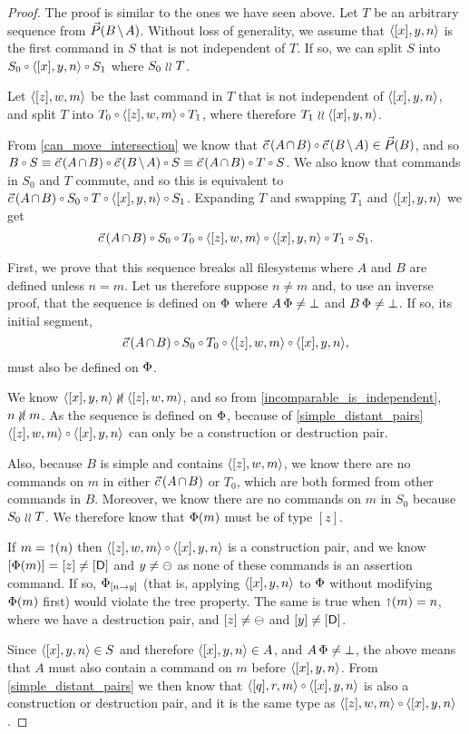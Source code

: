 \begin{proof}
The proof is similar to the ones we have seen above.
Let $T$ be an arbitrary sequence from $\orderset{\bmanp}$.
Without loss of generality, we assume that $\langle{[x],y,n}\rangle$ is the first command in $S$
that is not independent of $T$.
If so, we can split $S$ into $S_0\cc\cxynv\cc S_1$ where $S_0\mathrel{\wr\wr} T$.

Let $\langle{[z],w,m}\rangle$ be the last command in $T$ that is not independent of $\langle{[x],y,n}\rangle$,
and split $T$ into $T_0\cc\czwmv\cc T_1$, where therefore $T_1\mathrel{\wr\wr}\langle{[x],y,n}\rangle$.

From \cref{can_move_intersection} we know that
$\acb\cc\bma \in \orderset{B}$, and so
$B\cc S \equiv \acb\cc\bma\cc S \equiv \acb\cc T\cc S$.
We also know that commands in $S_0$ and $T$ commute, and so this is equivalent to
$\acb\cc S_0\cc T\cc\cxynv\cc S_1$.
Expanding $T$ and swapping $T_1$ and $\langle{[x],y,n}\rangle$ we get
\[ \acb\cc S_0\cc T_0 \cc \czwmv \cc \cxynv\cc T_1\cc S_1. \]

First, we prove that this sequence breaks all filesystems
where $A$ and $B$ are defined unless $n=m$.
Let us therefore suppose $n\neq m$ and, to use an inverse proof,
that the sequence is defined on $\Phi$ 
where $A\,\Phi\neq\bot$ and $B\,\Phi\neq\bot$.
If so, its initial segment,
\[ \acb\cc S_0\cc T_0 \cc \czwmv \cc \cxynv, \]
must also be defined on $\Phi$.

We know $\cxynv\nindep\czwmv$, and so from \cref{incomparable_is_independent}, $n\nunrel m$.
As the sequence is defined on $\Phi$,
because of \cref{simple_distant_pairs}
$\czwmv\cc\cxynv$ can only be a construction or destruction pair.

Also, because $B$ is simple and contains $\langle{[z],w,m}\rangle$,
we know there are no commands on $m$ 
in either $\acb$ or $T_0$, which are both formed from other commands in $B$.
Moreover, we know there are no commands on $m$ in $S_0$ because $S_0\mathrel{\wr\wr} T$.
We therefore know that $\Phi(m)$ must be of type $[z]$.

If $m=\mathord{\shortuparrow}({n})$ then $\czwmv\cc\cxynv$ is a construction pair, and we know
$[\Phi(m)]=[z]\neq[\mathsf{D}]$ and $y\neq\ominus$ as none of these commands is an assertion command.
If so, ${\Phi}_{[{n}\rightarrow{y}]}$ 
(that is, applying $\langle{[x],y,n}\rangle$ to $\Phi$ without modifying $\Phi(m)$ first) would violate the tree property.
The same is true when $\mathord{\shortuparrow}({m})=n$, where we have a destruction pair,
and $[z]\neq\ominus$ and $[y]\neq[\mathsf{D}]$.

Since $\langle{[x],y,n}\rangle\in S$ and therefore $\langle{[x],y,n}\rangle\in A$, and $A\,\Phi\neq\bot$,
the above means that $A$ must also contain a command on $m$ before $\langle{[x],y,n}\rangle$.
From \cref{simple_distant_pairs} we then know that $\cqrmv\cc\cxynv$
is also a construction or destruction pair, and it is the same type as
$\czwmv\cc\cxynv$.


\end{proof}
